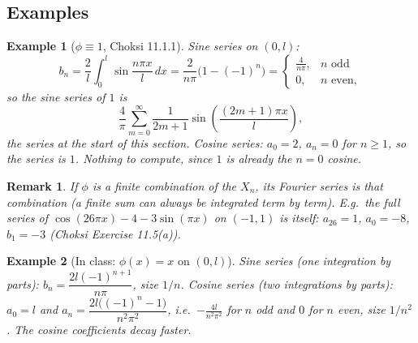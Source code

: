 \documentclass{article}
\newtheorem*{example}{Example}
\newtheorem{remark}{Remark}
\begin{document}
\subsection{Examples}
\begin{example}[$\phi \equiv 1$, Choksi 11.1.1]
    Sine series on $(0,l)$:
    \begin{equation}
        b_n = \frac{2}{l}\int_0^l\sin\frac{n\pi x}{l}\,dx = \frac{2}{n\pi}\big(1 - (-1)^n\big) = \begin{cases}\frac{4}{n\pi}, & n \text{ odd} \\ 0, & n \text{ even},\end{cases}
    \end{equation}
    so the sine series of $1$ is
    \begin{equation}\label{eq:SQ}
        \frac{4}{\pi}\sum_{m=0}^\infty \frac{1}{2m+1}\sin\left(\frac{(2m+1)\pi x}{l}\right),
    \end{equation}
    the series at the start of this section. Cosine series: $a_0 = 2$, $a_n = 0$ for $n \geq 1$, so the series is $1$. Nothing to compute, since $1$ is already the $n = 0$ cosine.
\end{example}
\begin{remark}
    If $\phi$ is a finite combination of the $X_n$, its Fourier series is that combination (a finite sum can always be integrated term by term). E.g.\ the full series of $\cos(26\pi x) - 4 - 3\sin(\pi x)$ on $(-1,1)$ is itself: $a_{26} = 1$, $a_0 = -8$, $b_1 = -3$ (Choksi Exercise 11.5(a)).
\end{remark}
\begin{example}[In class: $\phi(x) = x$ on $(0,l)$]
    Sine series (one integration by parts): $b_n = \dfrac{2l(-1)^{n+1}}{n\pi}$, size $1/n$. Cosine series (two integrations by parts): $a_0 = l$ and $a_n = \dfrac{2l\big((-1)^n - 1\big)}{n^2\pi^2}$, i.e.\ $-\frac{4l}{n^2\pi^2}$ for $n$ odd and $0$ for $n$ even, size $1/n^2$. The cosine coefficients decay faster.
\end{example}
\end{document}
